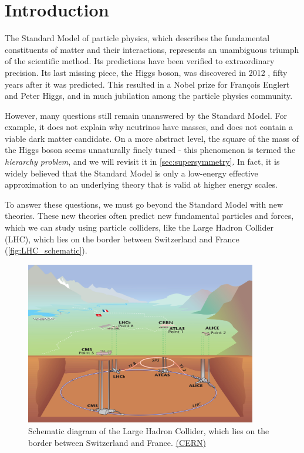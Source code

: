 \chapter{Introduction}\label{ch:introduction}
The Standard Model of particle physics, which describes the fundamental constituents of matter and their interactions, represents an unambiguous triumph of the scientific method. Its predictions have been verified to extraordinary precision. Its last missing piece, the Higgs boson, was discovered in 2012 \cite{Aad:2012tfa,Chatrchyan:2012xdj}, fifty years after it was predicted. This resulted in a Nobel prize for François Englert and Peter Higgs, and in much jubilation among the particle physics community. 

However, many questions still remain unanswered by the Standard Model. For example, it does not explain why neutrinos have masses, and does not contain a viable dark matter candidate. On a more abstract level, the square of the mass of the Higgs boson seems unnaturally finely tuned - this phenomenon is termed the \emph{hierarchy problem}, and we will revisit it in \autoref{sec:supersymmetry}. In fact, it is widely believed that the Standard Model is only a low-energy effective approximation to an underlying theory that is valid at higher energy scales.

To answer these questions, we must go beyond the Standard Model with new theories. These new theories often predict new fundamental particles and forces, which we can study using particle colliders, like the Large Hadron Collider (LHC), which lies on the border between Switzerland and France (\autoref{fig:LHC_schematic}).

\begin{figure}
  \centering
  \includegraphics[width=0.9\textwidth]{images/LHC}
  \caption{Schematic diagram of the Large Hadron Collider, which lies on the border between Switzerland and France. \href{http://cds.cern.ch/journal/CERNBulletin/2008/38/News\%20Articles/1125888?ln=en}{(CERN)}}
  \label{fig:LHC_schematic}
\end{figure}

